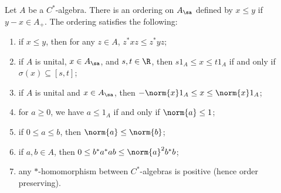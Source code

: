 \documentclass[10pt]{mypackage}
\begin{document}
\begin{proposition}
  Let $A$ be a $C^{\ast}$-algebra. There is an ordering on $A_{\sa}$ defined by $x\leq y$ if $y-x \in A_{+}$. The ordering satisfies the following:
  \begin{enumerate}[(1)]
    \item if $x\leq y$, then for any $z\in A$, $z^{\ast}xz \leq z^{\ast}yz$;
    \item if $A$ is unital, $x\in A_{\sa}$, and $s,t\in \R$, then $s1_A \leq x \leq t1_A$ if and only if $\sigma\left(x\right)\subseteq [s,t]$;
    \item if $A$ is unital and $x\in A_{\sa}$, then $-\norm{x}1_A \leq x \leq \norm{x}1_A$;
    \item for $a\geq 0$, we have $a\leq 1_A$ if and only if $\norm{a}\leq 1$;
    \item if $0 \leq a \leq b$, then $\norm{a}\leq \norm{b}$;
    \item if $a,b\in A$, then $0\leq b^{\ast}a^{\ast}ab \leq \norm{a}^2b^{\ast}b$;
    \item any $\ast$-homomorphism between $C^{\ast}$-algebras is positive (hence order preserving).
  \end{enumerate}
\end{proposition}
\end{document}
